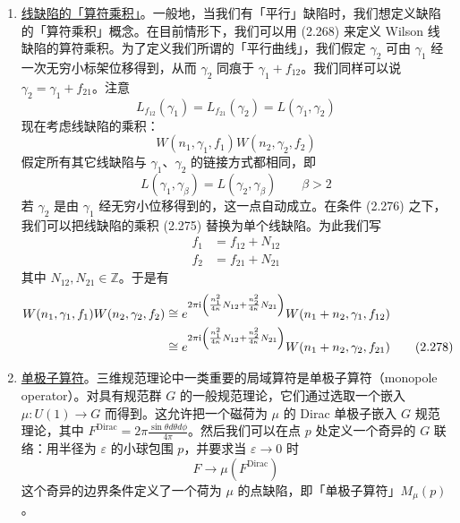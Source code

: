 \begin{enumerate}
  \item \underline{线缺陷的「算符乘积」}。一般地，当我们有「平行」缺陷时，我们想定义缺陷的「算符乘积」概念。在目前情形下，我们可以用 (2.268) 来定义 Wilson 线缺陷的算符乘积。为了定义我们所谓的「平行曲线」，我们假定 $\gamma_2$ 可由 $\gamma_1$ 经一次无穷小标架位移得到，从而 $\gamma_2$ 同痕于 $\gamma_1+f_{12}$。我们同样可以说 $\gamma_2=\gamma_1+f_{21}$。注意
  \begin{equation}
    L_{f_{12}}(\gamma_1)=L_{f_{21}}(\gamma_2)=L(\gamma_1,\gamma_2)
    \tag{2.274}
    \label{eq:2.274}
  \end{equation}
  现在考虑线缺陷的乘积：
  \begin{equation}
    W(n_1,\gamma_1,f_1)W(n_2,\gamma_2,f_2)
    \tag{2.275}
    \label{eq:2.275}
  \end{equation}
  假定所有其它线缺陷与 $\gamma_1$、$\gamma_2$ 的链接方式都相同，即
  \begin{equation}
    L(\gamma_1,\gamma_{\beta})=L(\gamma_2,\gamma_{\beta})\qquad\beta>2
    \tag{2.276}
    \label{eq:2.276}
  \end{equation}
  若 $\gamma_2$ 是由 $\gamma_1$ 经无穷小位移得到的，这一点自动成立。在条件 (2.276) 之下，我们可以把线缺陷的乘积 (2.275) 替换为单个线缺陷。为此我们写
  \begin{equation}
    \begin{aligned}
      f_1 &= f_{12}+N_{12}\\
      f_2 &= f_{21}+N_{21}
    \end{aligned}
    \tag{2.277}
    \label{eq:2.277}
  \end{equation}
  其中 $N_{12},N_{21}\in\mathbb{Z}$。于是有
  \begin{align}
    W(n_1,\gamma_1,f_1)W(n_2,\gamma_2,f_2)
      &\cong e^{2\pi\mathrm{i}\left(\frac{n_1^{2}}{4\kappa}N_{12}+\frac{n_2^{2}}{4\kappa}N_{21}\right)}W(n_1+n_2,\gamma_1,f_{12}) \notag\\
      &\cong e^{2\pi\mathrm{i}\left(\frac{n_1^{2}}{4\kappa}N_{12}+\frac{n_2^{2}}{4\kappa}N_{21}\right)}W(n_1+n_2,\gamma_2,f_{21})
    \tag{2.278}
    \label{eq:2.278}
  \end{align}

  \item \underline{单极子算符}。三维规范理论中一类重要的局域算符是单极子算符（monopole operator）。对具有规范群 $G$ 的一般规范理论，它们通过选取一个嵌入 $\mu:U(1)\to G$ 而得到。这允许把一个磁荷为 $\mu$ 的 Dirac 单极子嵌入 $G$ 规范理论，其中 $F^{\mathrm{Dirac}}=2\pi\frac{\sin\theta d\theta d\phi}{4\pi}$。然后我们可以在点 $p$ 处定义一个奇异的 $G$ 联络：用半径为 $\varepsilon$ 的小球包围 $p$，并要求当 $\varepsilon\to0$ 时
  \begin{equation}
    F\to\mu(F^{\mathrm{Dirac}})
    \tag{2.279}
    \label{eq:2.279}
  \end{equation}
  这个奇异的边界条件定义了一个荷为 $\mu$ 的点缺陷，即「单极子算符」$M_{\mu}(p)$。


\end{enumerate}
